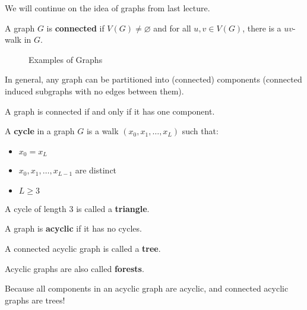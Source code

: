 
We will continue on the idea of graphs from last lecture.
\begin{definition}
	A graph \( G \) is \textbf{connected} if \( V(G) \neq \varnothing \) and for all \( u,v\in V(G) \), there is a \( uv \)-walk in \( G \).
\end{definition}

\begin{figure}[ht]
    \centering
    \caption{Examples of Graphs}
    \label{fig:a-disconnected-graph}
\end{figure}

In general, any graph can be partitioned into (connected) components (connected induced subgraphs with no edges between them).

\begin{note}
	A graph is connected if and only if it has one component.
\end{note}

\begin{definition}
	A \textbf{cycle} in a graph \( G \) is a walk \( (x_{0}, x_{1},\ldots, x_{L}) \) such that:
	\begin{itemize}
		\item \( x_{0} = x_L \)
		\item \( x_{0}, x_{1}, \ldots, x_{L - 1} \) are distinct
		\item \( L \geq 3 \)
	\end{itemize}
\end{definition}

\begin{definition}
	A cycle of length 3 is called a \textbf{triangle}.
\end{definition}

\begin{definition}
	A graph is \textbf{acyclic} if it has no cycles.
\end{definition}

\begin{definition}
	A connected acyclic graph is called a \textbf{tree}.
\end{definition}

\begin{definition}
	Acyclic graphs are also called \textbf{forests}.
\end{definition}
\begin{remark}
	Because all components in an acyclic graph are acyclic, and connected acyclic graphs are trees!
\end{remark}

